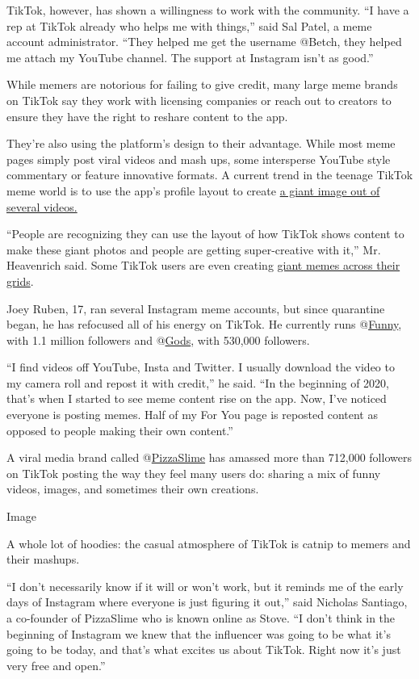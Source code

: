TikTok, however, has shown a willingness to work with the community. ``I
have a rep at TikTok already who helps me with things,'' said Sal Patel,
a meme account administrator. ``They helped me get the username @Betch,
they helped me attach my YouTube channel. The support at Instagram isn't
as good.''

While memers are notorious for failing to give credit, many large meme
brands on TikTok say they work with licensing companies or reach out to
creators to ensure they have the right to reshare content to the app.

They're also using the platform's design to their advantage. While most
meme pages simply post viral videos and mash ups, some intersperse
YouTube style commentary or feature innovative formats. A current trend
in the teenage TikTok meme world is to use the app's profile layout to
create \href{https://www.tiktok.com/@kyliee90}{a giant image out of
several videos.}

``People are recognizing they can use the layout of how TikTok shows
content to make these giant photos and people are getting super-creative
with it,'' Mr. Heavenrich said. Some TikTok users are even creating
\href{https://www.tiktok.com/@kaneyeast}{giant memes across their
grids}.

Joey Ruben, 17, ran several Instagram meme accounts, but since
quarantine began, he has refocused all of his energy on TikTok. He
currently runs @\href{https://www.tiktok.com/@funny}{Funny}, with 1.1
million followers and @\href{https://www.tiktok.com/@gods}{Gods}, with
530,000 followers.

``I find videos off YouTube, Insta and Twitter. I usually download the
video to my camera roll and repost it with credit,'' he said. ``In the
beginning of 2020, that's when I started to see meme content rise on the
app. Now, I've noticed everyone is posting memes. Half of my For You
page is reposted content as opposed to people making their own
content.''

A viral media brand called
@\href{https://www.tiktok.com/@pizzaslime}{PizzaSlime} has amassed more
than 712,000 followers on TikTok posting the way they feel many users
do: sharing a mix of funny videos, images, and sometimes their own
creations.

Image

A whole lot of hoodies: the casual atmosphere of TikTok is catnip to
memers and their mashups.

``I don't necessarily know if it will or won't work, but it reminds me
of the early days of Instagram where everyone is just figuring it out,''
said Nicholas Santiago, a co-founder of PizzaSlime who is known online
as Stove. ``I don't think in the beginning of Instagram we knew that the
influencer was going to be what it's going to be today, and that's what
excites us about TikTok. Right now it's just very free and open.''

